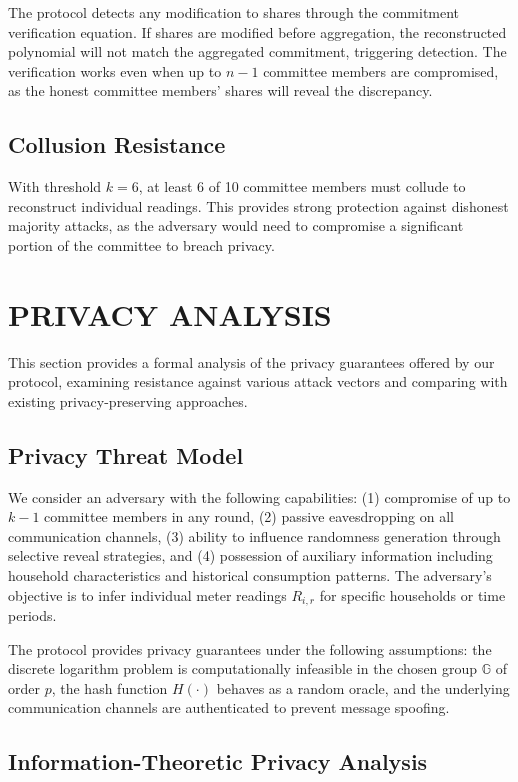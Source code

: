 \documentclass[conference]{IEEEtran}
\begin{document}
The protocol detects any modification to shares through the commitment verification equation. If shares are modified before aggregation, the reconstructed polynomial will not match the aggregated commitment, triggering detection. The verification works even when up to $n-1$ committee members are compromised, as the honest committee members' shares will reveal the discrepancy.

\subsection{Collusion Resistance}

With threshold $k = 6$, at least 6 of 10 committee members must collude to reconstruct individual readings. This provides strong protection against dishonest majority attacks, as the adversary would need to compromise a significant portion of the committee to breach privacy.

\section{PRIVACY ANALYSIS}

This section provides a formal analysis of the privacy guarantees offered by our protocol, examining resistance against various attack vectors and comparing with existing privacy-preserving approaches.

\subsection{Privacy Threat Model}

We consider an adversary with the following capabilities: (1) compromise of up to \(k-1\) committee members in any round, (2) passive eavesdropping on all communication channels, (3) ability to influence randomness generation through selective reveal strategies, and (4) possession of auxiliary information including household characteristics and historical consumption patterns. The adversary's objective is to infer individual meter readings \(R_{i,r}\) for specific households or time periods.

The protocol provides privacy guarantees under the following assumptions: the discrete logarithm problem is computationally infeasible in the chosen group \(\mathbb{G}\) of order \(p\), the hash function \(H(\cdot)\) behaves as a random oracle, and the underlying communication channels are authenticated to prevent message spoofing.

\subsection{Information-Theoretic Privacy Analysis}
\end{document}
